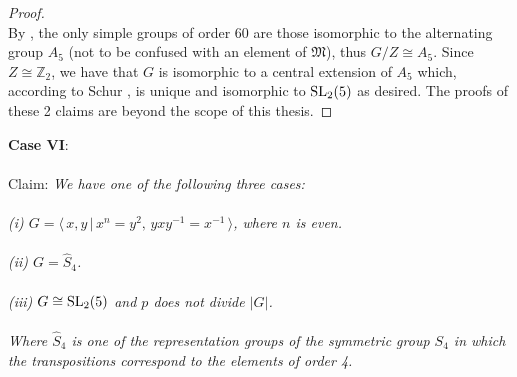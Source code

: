 \begin{proof}
\\
By \cite[p.145]{dummit}, the only simple groups of order 60 are those isomorphic to the alternating group $A_5$ (not to be confused with an element of $\mathfrak{M}$), thus $G / Z \cong A_5$. Since $Z \cong \mathbb{Z}_2$, we have that $G$ is isomorphic to a central extension of $A_5$ which, according to Schur \cite{schur}, is unique and isomorphic to $\operatorname{SL}_2(5)$ as desired. The proofs of these 2 claims are beyond the scope of this thesis. \qedhere

\end{proof}

\textbf{Case VI}:\\
\\
Claim: \textit{We have one of the following three cases: \\
\\
(i) $G = \langle \, x,y \, | \, x^n = y^2, \, yxy^{-1} = x^{-1} \, \rangle$, where $n$ is even. \\
\\
(ii) $G = \widehat{S}_4$. \\
\\
(iii) $G \cong \operatorname{SL}_2(5)$ and $p$ does not divide $|G|$. \\
\\
Where $\widehat{S}_4$ is one of the representation groups of the symmetric group $S_4$ in which the transpositions correspond to the elements of order 4.} \\

